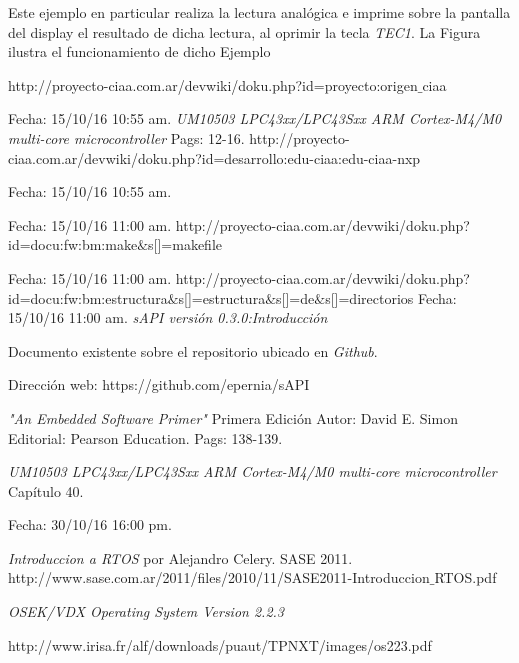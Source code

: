 \documentclass[12pt,letterpaper]{article}
\begin{document}
Este ejemplo en particular realiza la lectura analógica e imprime sobre la pantalla del display el resultado de dicha lectura, al oprimir la tecla \textit{TEC1}. La Figura  ilustra el funcionamiento de dicho Ejemplo 
\begin{thebibliography}{}
 {\footnotesize http://proyecto-ciaa.com.ar/devwiki/doku.php?id=proyecto:origen$\_$ciaa}

Fecha: 15/10/16 10:55 am.
\textit{UM10503
LPC43xx/LPC43Sxx ARM Cortex-M4/M0 multi-core
microcontroller} Pags: 12-16.
 {\footnotesize http://proyecto-ciaa.com.ar/devwiki/doku.php?id=desarrollo:edu-ciaa:edu-ciaa-nxp}

Fecha: 15/10/16 10:55 am.
\

Fecha: 15/10/16 11:00 am.
 {\footnotesize http://proyecto-ciaa.com.ar/devwiki/doku.php?id=docu:fw:bm:make$\&$s[]=makefile}

Fecha: 15/10/16 11:00 am.
 {\footnotesize http://proyecto-ciaa.com.ar/devwiki/doku.php?id=docu:fw:bm:estructura$\&$s[]=estructura$\&$s[]=de$\&$s[]=directorios} Fecha: 15/10/16 11:00 am.
\textit{sAPI versión 0.3.0:Introducción}

Documento existente sobre el repositorio ubicado en \textit{Github}.

Dirección web: https://github.com/epernia/sAPI

\textit{"An Embedded Software Primer"} Primera Edición Autor: David E. Simon Editorial: Pearson Education. Pags: 138-139.

 \textit{UM10503 LPC43xx/LPC43Sxx ARM Cortex-M4/M0 multi-core microcontroller} Capítulo 40.


Fecha: 30/10/16 16:00 pm.

 \textit{Introduccion a RTOS} por Alejandro Celery. SASE 2011.
{\footnotesize http://www.sase.com.ar/2011/files/2010/11/SASE2011-Introduccion$\_$RTOS.pdf}

\textit{OSEK/VDX Operating System Version 2.2.3}

{\footnotesize http://www.irisa.fr/alf/downloads/puaut/TPNXT/images/os223.pdf}


\end{thebibliography}
\end{document}
